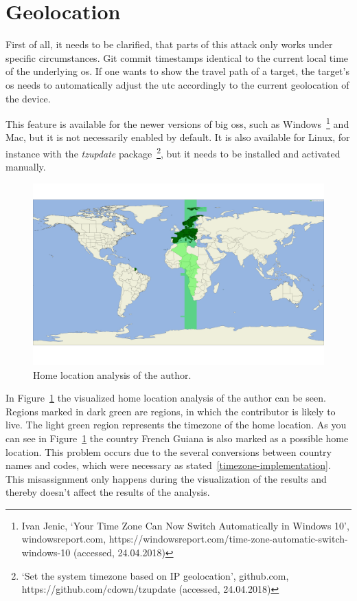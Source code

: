 \section{Geolocation}

First of all, it needs to be clarified, that parts of this attack only works under specific circumstances.
Git commit timestamps identical to the current local time of the underlying \ac{os}.
If one wants to show the travel path of a target, the target's \ac{os} needs to automatically adjust the \ac{utc} accordingly to the current geolocation of the device.

This feature is available for the newer versions of big \acp{os}, such as Windows~\footnote{Ivan Jenic, `Your Time Zone Can Now Switch Automatically in Windows 10', windowsreport.com, https://windowsreport.com/time-zone-automatic-switch-windows-10 (accessed, 24.04.2018)}
and Mac, but it is not necessarily enabled by default.
It is also available for Linux, for instance with the \emph{tzupdate} package~\footnote{`Set the system timezone based on IP geolocation', github.com, https://github.com/cdown/tzupdate (accessed, 24.04.2018)}, but it needs to be installed and activated manually.

\begin{figure}[H]
    \includegraphics[scale=0.10]{./graphs/analysis/author-home-location}
    \centering
    \caption{Home location analysis of the author.}\label{fig:author-home-location}
\end{figure}

In Figure~\ref{fig:author-home-location} the visualized home location analysis of the author can be seen.
Regions marked in dark green are regions, in which the contributor is likely to live.
The light green region represents the timezone of the home location.
As you can see in Figure~\ref{fig:author-home-location} the country French Guiana is also marked as a possible home location.
This problem occurs due to the several conversions between country names and codes, which were necessary as stated~\ref{timezone-implementation}.
This misassignment only happens during the visualization of the results and thereby doesn't affect the results of the analysis.

